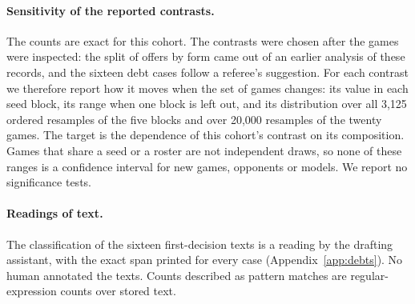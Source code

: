 \paragraph{Sensitivity of the reported contrasts.}
The counts are exact for this cohort. The contrasts were chosen after the games were inspected: the split of offers by form came out of an earlier analysis of these records, and the sixteen debt cases follow a referee's suggestion. For each contrast we therefore report how it moves when the set of games changes: its value in each seed block, its range when one block is left out, and its distribution over all 3,125 ordered resamples of the five blocks and over 20,000 resamples of the twenty games. The target is the dependence of this cohort's contrast on its composition. Games that share a seed or a roster are not independent draws, so none of these ranges is a confidence interval for new games, opponents or models. We report no significance tests.

\paragraph{Readings of text.}
The classification of the sixteen first-decision texts is a reading by the drafting assistant, with the exact span printed for every case (Appendix~\ref{app:debts}). No human annotated the texts. Counts described as pattern matches are regular-expression counts over stored text.
